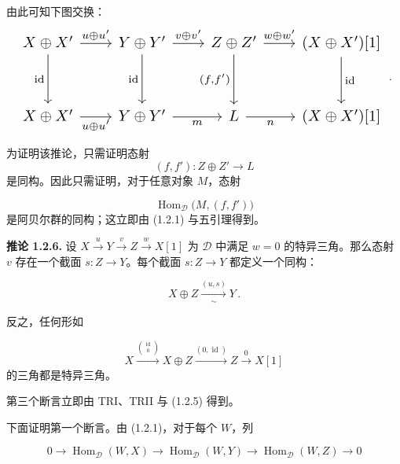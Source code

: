 \clearpage
{}%
\begingroup
\small
\setlength{\abovedisplayskip}{4pt plus 2pt minus 2pt}%
\setlength{\belowdisplayskip}{4pt plus 2pt minus 2pt}%

由此可知下图交换：
\begin{equation*}
  \resizebox{0.98\linewidth}{!}{%
    $\begin{tikzcd}[ampersand replacement=\&,column sep=2.1em,row sep=3.1em]
      X\oplus X' \arrow[r,"{u\oplus u'}"] \arrow[d,"{\operatorname{id}}"']
        \& Y\oplus Y' \arrow[r,"{v\oplus v'}"] \arrow[d,"{\operatorname{id}}"']
        \& Z\oplus Z' \arrow[r,"{w\oplus w'}"] \arrow[d,"{(f,f')}"']
        \& (X\oplus X')[1] \arrow[d,"{\operatorname{id}}"] \\
      X\oplus X' \arrow[r,"{u\oplus u'}"']
        \& Y\oplus Y' \arrow[r,"m"']
        \& L \arrow[r,"n"']
        \& (X\oplus X')[1]
    \end{tikzcd}$%
  }\,.
\end{equation*}

为证明该推论，只需证明态射
\[
  (f,f')\colon Z\oplus Z'\longrightarrow L
\]
是同构。因此只需证明，对于任意对象 $M$，态射

\[
  \operatorname{Hom}_{\mathcal D}\bigl(M,(f,f')\bigr)
\]
是阿贝尔群的同构；这立即由 (1.2.1) 与五引理得到。


\medskip
\noindent\textbf{推论 1.2.6.}\quad
设 $X\xrightarrow{u}Y\xrightarrow{v}Z\xrightarrow{w}X[1]$ 为
$\mathcal D$ 中满足 $w=0$ 的特异三角。那么态射 $v$ 存在一个截面
$s\colon Z\longrightarrow Y$。每个截面 $s\colon Z\longrightarrow Y$
都定义一个同构：

\[
  X\oplus Z\xrightarrow[\sim]{(u,s)}Y\,.
\]

反之，任何形如

\begin{equation}
  X\xrightarrow{\binom{\operatorname{id}}{0}}X\oplus Z
  \xrightarrow{(0,\operatorname{id})}Z\xrightarrow{0}X[1]
  \tag{1.2.6.1}
\end{equation}
的三角都是特异三角。

第三个断言立即由 TRI、TRII 与 (1.2.5) 得到。

下面证明第一个断言。由 (1.2.1)，对于每个 $W$，列

\begin{equation}
  0\longrightarrow\operatorname{Hom}_{\mathcal D}(W,X)
  \longrightarrow\operatorname{Hom}_{\mathcal D}(W,Y)
  \longrightarrow\operatorname{Hom}_{\mathcal D}(W,Z)
  \longrightarrow0
  \tag{1.2.6.2}
\end{equation}
\endgroup
